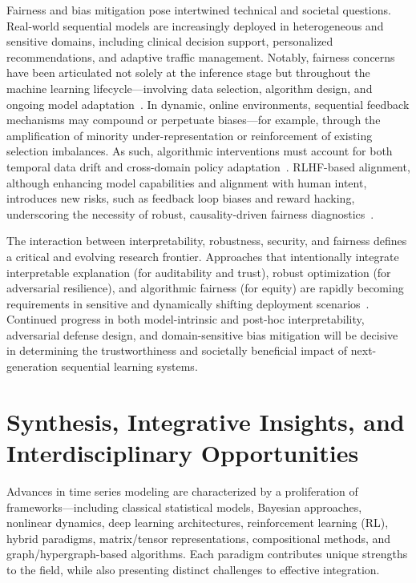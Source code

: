\documentclass[sigconf]{acmart}
\begin{document}
Fairness and bias mitigation pose intertwined technical and societal questions. Real-world sequential models are increasingly deployed in heterogeneous and sensitive domains, including clinical decision support, personalized recommendations, and adaptive traffic management. Notably, fairness concerns have been articulated not solely at the inference stage but throughout the machine learning lifecycle—involving data selection, algorithm design, and ongoing model adaptation~\cite{ref47}\cite{ref48}\cite{ref70}\cite{ref71}\cite{ref79}. In dynamic, online environments, sequential feedback mechanisms may compound or perpetuate biases—for example, through the amplification of minority under-representation or reinforcement of existing selection imbalances. As such, algorithmic interventions must account for both temporal data drift and cross-domain policy adaptation~\cite{ref47}\cite{ref48}\cite{ref70}. RLHF-based alignment, although enhancing model capabilities and alignment with human intent, introduces new risks, such as feedback loop biases and reward hacking, underscoring the necessity of robust, causality-driven fairness diagnostics~\cite{ref47}\cite{ref70}\cite{ref79}.

The interaction between interpretability, robustness, security, and fairness defines a critical and evolving research frontier. Approaches that intentionally integrate interpretable explanation (for auditability and trust), robust optimization (for adversarial resilience), and algorithmic fairness (for equity) are rapidly becoming requirements in sensitive and dynamically shifting deployment scenarios~\cite{ref31}\cite{ref62}\cite{ref67}\cite{ref69}\cite{ref79}\cite{ref86}. Continued progress in both model-intrinsic and post-hoc interpretability, adversarial defense design, and domain-sensitive bias mitigation will be decisive in determining the trustworthiness and societally beneficial impact of next-generation sequential learning systems.

\section{Synthesis, Integrative Insights, and Interdisciplinary Opportunities}

Advances in time series modeling are characterized by a proliferation of frameworks—including classical statistical models, Bayesian approaches, nonlinear dynamics, deep learning architectures, reinforcement learning (RL), hybrid paradigms, matrix/tensor representations, compositional methods, and graph/hypergraph-based algorithms. Each paradigm contributes unique strengths to the field, while also presenting distinct challenges to effective integration.
\end{document}
